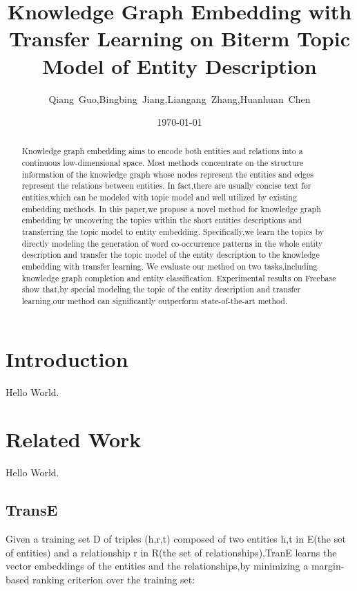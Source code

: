 \documentclass[11pt]{article}
\title{Knowledge Graph Embedding with Transfer Learning on Biterm Topic Model of Entity Description}
\author{Qiang~Guo,Bingbing~Jiang,Liangang~Zhang,Huanhuan~Chen}
\date{\today}
\begin{document}
\maketitle
\begin{abstract}
  Knowledge graph embedding aims to encode both entities and relations into a continuous low-dimensional space.
  Most methods concentrate on the structure information of the knowledge graph whose nodes represent the entities and edges represent the relations between entities.
  In fact,there are usually concise text for entities,which can be modeled with topic model and well utilized by existing embedding methods.
  In this paper,we propose a novel method for knowledge graph embedding by uncovering the topics within the short entities descriptions and transferring the topic model to entity embedding.
  Specifically,we learn the topics by directly modeling the generation of word co-occurrence patterns in the whole entity description and transfer the topic model of the entity description to the knowledge embedding with transfer learning.
  We evaluate our method on two tasks,including knowledge graph completion and entity classification.
  Experimental results on Freebase show that,by special modeling the topic of the entity description and transfer learning,our method can significantly outperform state-of-the-art method.
\end{abstract}

\section{Introduction}

Hello World.


\section{Related Work}

Hello World.

\subsection{TransE}

Given a training set D of triples (h,r,t) composed of two entities h,t in E(the set of entities) and a relationship r in R(the set of relationships),TranE learns the vector embeddings of the entities and the relationships,by minimizing a margin-based ranking criterion over the training set:
\end{document}
